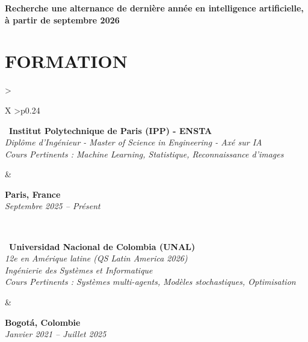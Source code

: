 \documentclass[letterpaper,10pt]{article}
\begin{document}
\vspace{0.15cm}

\textbf{Recherche une alternance de dernière année en intelligence artificielle, à partir de septembre 2026} 


\vspace{0.02cm}

\section{\textcolor{mydarkgreen}{\textbf{FORMATION}}}

\begin{tabularx}{\textwidth}{>{\raggedright\arraybackslash}X >{\raggedleft\arraybackslash}p{0.24\textwidth}}
  \begin{minipage}[t]{\linewidth}\raggedright
  \textbullet\ \textbf{Institut Polytechnique de Paris (IPP) - ENSTA}\\
  \textit{\footnotesize Diplôme d'Ingénieur - Master of Science in Engineering - Axé sur IA}\\
  \textit{\footnotesize Cours Pertinents : Machine Learning, Statistique, Reconnaissance d'images}
  \end{minipage}
  &
  \begin{minipage}[t]{\linewidth}\raggedleft
  \textbf{Paris, France}\\
  {\footnotesize\textit{Septembre 2025 -- Présent}}
  \end{minipage}
  \\
  \begin{minipage}[t]{\linewidth}
  \textbullet\ \textbf{Universidad Nacional de Colombia (UNAL)}\\
  \textit{\footnotesize 12e en Amérique latine (QS Latin America 2026)}\\
  \textit{\footnotesize Ingénierie des Systèmes et Informatique}\\
  \textit{\footnotesize Cours Pertinents : Systèmes multi-agents, Modèles stochastiques, Optimisation}
  \end{minipage}
  &
  \begin{minipage}[t]{\linewidth}\raggedleft
  \textbf{Bogotá, Colombie}\\
  {\footnotesize\textit{Janvier 2021 -- Juillet 2025}}

\end{minipage}
\end{tabularx}
\end{document}
